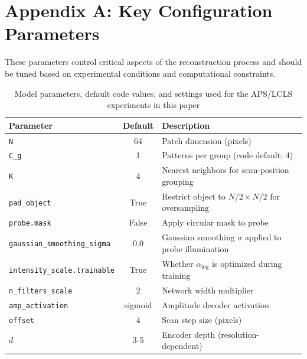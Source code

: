 \documentclass{optica-article}
\begin{document}
\section*{Appendix A: Key Configuration Parameters}
These parameters control critical aspects of the reconstruction process and should be tuned based on experimental conditions and computational constraints.
\begin{table}[h]
\renewcommand{\arraystretch}{1.2}
\centering
\caption{Model parameters, default code values, and settings used for the APS/LCLS experiments in this paper}
\label{tab:config_params}
\begin{tabular}{lcl}
\hline
\textbf{Parameter} & \textbf{Default} & \textbf{Description} \\
\hline
\texttt{N} & 64 & Patch dimension (pixels) \\
\texttt{C\_g} & 1 & Patterns per group (code default: 4) \\
\texttt{K} & 4 & Nearest neighbors for scan-position grouping \\
\texttt{pad\_object} & True & Restrict object to $N/2 \times N/2$ for oversampling \\
\texttt{probe.mask} & False & Apply circular mask to probe \\
\texttt{gaussian\_smoothing\_sigma} & 0.0 & Gaussian smoothing $\sigma$ applied to probe illumination \\
\texttt{intensity\_scale.trainable} & True & Whether $\alpha_{\log}$ is optimized during training \\
\texttt{n\_filters\_scale} & 2 & Network width multiplier \\
\texttt{amp\_activation} & sigmoid & Amplitude decoder activation \\
\texttt{offset} & 4 & Scan step size (pixels) \\
$d$ & 3-5 & Encoder depth (resolution-dependent) \\
\hline
\end{tabular}
\end{table}
\end{document}
